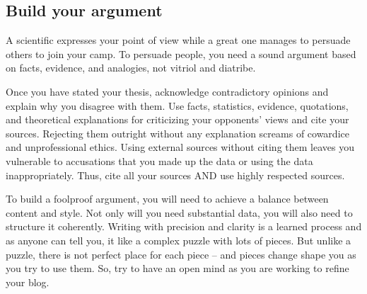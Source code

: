 \documentclass{tufte-handout}\usepackage[]{graphicx}\usepackage[]{color}
\begin{document}


\subsection{Build your argument}

A scientific expresses your point of view while a great one manages to persuade others to join your camp. To persuade people, you need a sound argument based on facts, evidence, and analogies, not vitriol and diatribe. 

Once you have stated your thesis, acknowledge contradictory opinions and explain why you disagree with them. Use facts, statistics, evidence, quotations, and theoretical explanations for criticizing your opponents' views and cite your sources. Rejecting them outright without any explanation screams of cowardice and unprofessional ethics. Using external sources without citing them leaves you vulnerable to accusations that you made up the data or using the data inappropriately. Thus, cite all your sources AND use highly respected sources.

To build a foolproof argument, you will need to achieve a balance between content and style. Not only will you need substantial data, you will also need to structure it coherently. Writing with precision and clarity is a learned process and as anyone can tell you, it like a complex puzzle with lots of pieces. But unlike a puzzle, there is not perfect place for each piece -- and pieces change shape you as you try to use them. So, try to have an open mind as you are working to refine your blog. 


\end{document}
